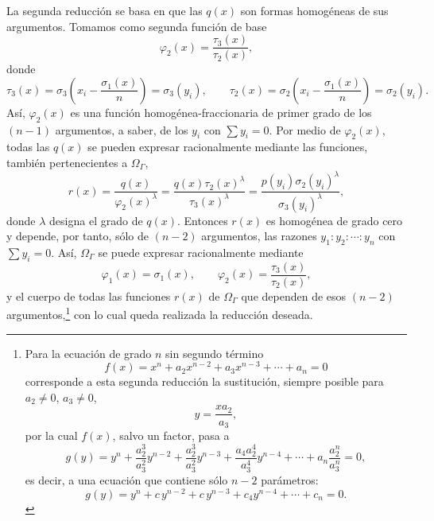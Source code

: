 \documentclass[11pt]{article}
\begin{document}
La segunda reducción se basa en que las $q(x)$ son formas homogéneas de sus argumentos. Tomamos como segunda función de base
\[
\varphi_2(x)=\frac{\tau_3(x)}{\tau_2(x)},
\]
donde
\[
\tau_3(x)=\sigma_3\left(x_i-\frac{\sigma_1(x)}{n}\right)=\sigma_3(y_i),
\qquad
\tau_2(x)=\sigma_2\left(x_i-\frac{\sigma_1(x)}{n}\right)=\sigma_2(y_i).
\]
Así, $\varphi_2(x)$ es una función homogénea-fraccionaria de primer grado de los $(n-1)$ argumentos, a saber, de los $y_i$ con $\sum y_i=0$. Por medio de $\varphi_2(x)$, todas las $q(x)$ se pueden expresar racionalmente mediante las funciones, también pertenecientes a $\Omega_\Gamma$,
\[
r(x)=\frac{q(x)}{\varphi_2(x)^\lambda}
=\frac{q(x)\tau_2(x)^\lambda}{\tau_3(x)^\lambda}
=\frac{p(y_i)\sigma_2(y_i)^\lambda}{\sigma_3(y_i)^\lambda},
\]
donde $\lambda$ designa el grado de $q(x)$. Entonces $r(x)$ es homogénea de grado cero y depende, por tanto, sólo de $(n-2)$ argumentos, las razones $y_1:y_2:\cdots:y_n$ con $\sum y_i=0$. Así, $\Omega_\Gamma$ se puede expresar racionalmente mediante
\[
\varphi_1(x)=\sigma_1(x),
\qquad
\varphi_2(x)=\frac{\tau_3(x)}{\tau_2(x)},
\]
y el cuerpo de todas las funciones $r(x)$ de $\Omega_\Gamma$ que dependen de esos $(n-2)$ argumentos,\footnote{Para la ecuación de grado $n$ sin segundo término
\[
f(x)=x^n+a_2x^{n-2}+a_3x^{n-3}+\cdots+a_n=0
\]
corresponde a esta segunda reducción la sustitución, siempre posible para $a_2\ne0$, $a_3\ne0$,
\[
y=\frac{x a_2}{a_3},
\]
por la cual $f(x)$, salvo un factor, pasa a
\[
g(y)=y^n+\frac{a_2^3}{a_3^2}y^{n-2}+\frac{a_2^3}{a_3^2}y^{n-3}
+\frac{a_4a_2^4}{a_3^4}y^{n-4}+\cdots+a_n\frac{a_2^n}{a_3^n}=0,
\]
es decir, a una ecuación que contiene sólo $n-2$ parámetros:
\[
g(y)=y^n+c\,y^{n-2}+c\,y^{n-3}+c_4y^{n-4}+\cdots+c_n=0.
\]} con lo cual queda realizada la reducción deseada.
\end{document}
